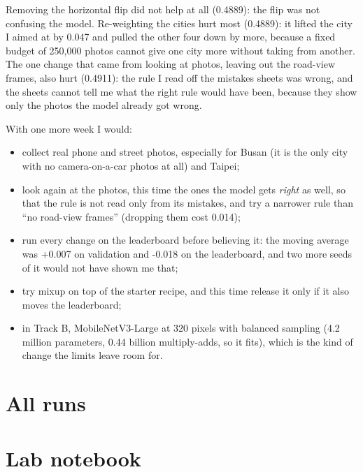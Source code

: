 \documentclass[11pt]{article}
\begin{document}
Removing the horizontal flip did not help at all (0.4889): the
flip was not confusing the model. Re-weighting the cities hurt most (0.4889):
it lifted the city I aimed at by 0.047 and pulled the other four down by more,
because a fixed budget of 250,000 photos cannot give one city more without
taking from another. The one change that came from looking at photos, leaving
out the road-view frames, also hurt (0.4911): the rule I read off the mistakes
sheets was wrong, and the sheets cannot tell me what the right rule would have
been, because they show only the photos the model already got wrong.

With one more week I would:

\begin{itemize}
\item collect real phone and street photos, especially for Busan (it is the
  only city with no camera-on-a-car photos at all) and Taipei;
\item look again at the photos, this time the ones the model gets \emph{right}
  as well, so that the rule is not read only from its mistakes, and try a
  narrower rule than ``no road-view frames'' (dropping them cost 0.014);
\item run every change on the leaderboard before believing it: the moving
  average was +0.007 on validation and -0.018 on the leaderboard, and two more
  seeds of it would not have shown me that;
\item try mixup on top of the starter recipe, and this time release it only if
  it also moves the leaderboard;
\item in Track B, MobileNetV3-Large at 320 pixels with balanced sampling (4.2
  million parameters, 0.44 billion multiply-adds, so it fits), which is the
  kind of change the limits leave room for.
\end{itemize}

\section*{All runs}

\section*{Lab notebook}
\end{document}
